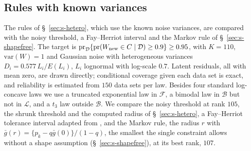 \documentclass[11pt]{article}
\renewcommand{\_}{\usc\allowbreak}
\newcommand{\pr}{\mathrm{pr}}
\newcommand{\LC}{\mathcal{L}}
\newcommand{\var}{\mathrm{var}}
\begin{document}
\subsection*{Rules with known variances}

The rules of \S~\ref{sec:s-hetero}, which use the known noise variances, are compared with the noisy threshold, a Fay--Herriot interval and the Markov rule of \S~\ref{sec:s-shapefree}. The target is $\pr_{\mathcal D}\{\pr(W_{\rm new} \in C \mid \mathcal D) \ge 0.9\} \ge 0.95$, with $K = 110$, $\var(W) = 1$ and Gaussian noise with heterogeneous variances $D_i = 0.577\,L_i/E(L_i)$, $L_i$ lognormal with log-scale $0.7$. Latent residuals, all with mean zero, are drawn directly; conditional coverage given each data set is exact, and reliability is estimated from $150$ data sets per law. Besides four standard log-concave laws we use a truncated exponential law in $\mathcal F$, a bimodal law in $\mathcal B$ but not in $\LC$, and a $t_3$ law outside $\mathcal B$. We compare the noisy threshold at rank $105$, the shrunk threshold and the computed radius of \S~\ref{sec:s-hetero}, a Fay--Herriot tolerance interval adapted from \citet{chatterjee2008}, and the Markov rule, the radius $r$ with $\bar g(r) = \{p_k - q\bar g(0)\}/(1 - q)$, the smallest the single constraint allows without a shape assumption (\S~\ref{sec:s-shapefree}), at its best rank, $107$.
\end{document}
